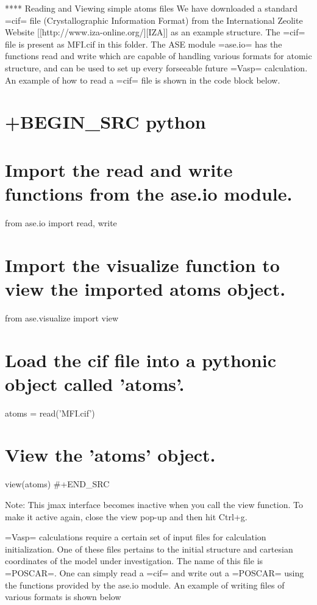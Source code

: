 \documentclass[11pt]{article}
\begin{document}
**** Reading and Viewing simple atoms files We have downloaded a
standard =cif= file (Crystallographic Information Format) from the
International Zeolite Website
{[}{[}http://www.iza-online.org/{]}{[}IZA{]}{]} as an example structure.
The =cif= file is present as MFI.cif in this folder. The ASE module
=ase.io= has the functions read and write which are capable of handling
various formats for atomic structure, and can be used to set up every
forseeable future =Vasp= calculation. An example of how to read a =cif=
file is shown in the code block below.

\section{+BEGIN\_SRC python}\label{begin_src-python}

\section{Import the read and write functions from the ase.io
module.}\label{import-the-read-and-write-functions-from-the-ase.io-module.}

from ase.io import read, write

\section{Import the visualize function to view the imported atoms
object.}\label{import-the-visualize-function-to-view-the-imported-atoms-object.}

from ase.visualize import view

\section{Load the cif file into a pythonic object called
'atoms'.}\label{load-the-cif-file-into-a-pythonic-object-called-atoms.}

atoms = read('MFI.cif')

\section{View the 'atoms' object.}\label{view-the-atoms-object.}

view(atoms) \#+END\_SRC

Note: This jmax interface becomes inactive when you call the view
function. To make it active again, close the view pop-up and then hit
Ctrl+g.

=Vasp= calculations require a certain set of input files for calculation
initialization. One of these files pertains to the initial structure and
cartesian coordinates of the model under investigation. The name of this
file is =POSCAR=. One can simply read a =cif= and write out a =POSCAR=
using the functions provided by the ase.io module. An example of writing
files of various formats is shown below
\end{document}
